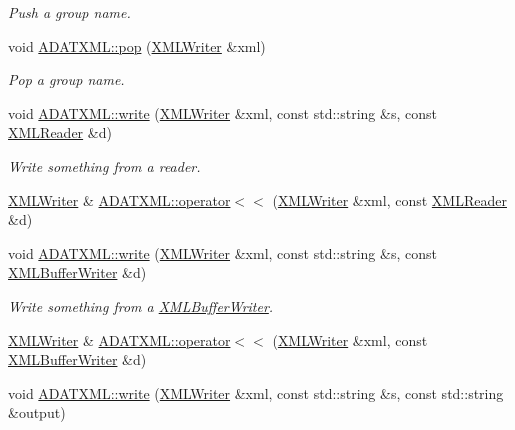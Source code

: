 \begin{DoxyCompactItemize}
\begin{DoxyCompactList}\small\item\em Push a group name. \end{DoxyCompactList}\item 
void \mbox{\hyperlink{group__io_gac235f191b977af85918b9a9d063ba5f4}{A\+D\+A\+T\+X\+M\+L\+::pop}} (\mbox{\hyperlink{classADATXML_1_1XMLWriter}{X\+M\+L\+Writer}} \&xml)
\begin{DoxyCompactList}\small\item\em Pop a group name. \end{DoxyCompactList}\item 
void \mbox{\hyperlink{group__io_ga0b5b9fff1a99b7e41bb286c7c153ff78}{A\+D\+A\+T\+X\+M\+L\+::write}} (\mbox{\hyperlink{classADATXML_1_1XMLWriter}{X\+M\+L\+Writer}} \&xml, const std\+::string \&s, const \mbox{\hyperlink{classADATXML_1_1XMLReader}{X\+M\+L\+Reader}} \&d)
\begin{DoxyCompactList}\small\item\em Write something from a reader. \end{DoxyCompactList}\item 
\mbox{\hyperlink{classADATXML_1_1XMLWriter}{X\+M\+L\+Writer}} \& \mbox{\hyperlink{group__io_gaeedb0da293eebaa00dff464efbb18eab}{A\+D\+A\+T\+X\+M\+L\+::operator$<$$<$}} (\mbox{\hyperlink{classADATXML_1_1XMLWriter}{X\+M\+L\+Writer}} \&xml, const \mbox{\hyperlink{classADATXML_1_1XMLReader}{X\+M\+L\+Reader}} \&d)
\item 
void \mbox{\hyperlink{group__io_ga14c568a7a3ffb3e486c9036ff7382f8e}{A\+D\+A\+T\+X\+M\+L\+::write}} (\mbox{\hyperlink{classADATXML_1_1XMLWriter}{X\+M\+L\+Writer}} \&xml, const std\+::string \&s, const \mbox{\hyperlink{classADATXML_1_1XMLBufferWriter}{X\+M\+L\+Buffer\+Writer}} \&d)
\begin{DoxyCompactList}\small\item\em Write something from a \mbox{\hyperlink{classADATXML_1_1XMLBufferWriter}{X\+M\+L\+Buffer\+Writer}}. \end{DoxyCompactList}\item 
\mbox{\hyperlink{classADATXML_1_1XMLWriter}{X\+M\+L\+Writer}} \& \mbox{\hyperlink{group__io_ga5f6c03929b05296b731cf36fb65cf9c6}{A\+D\+A\+T\+X\+M\+L\+::operator$<$$<$}} (\mbox{\hyperlink{classADATXML_1_1XMLWriter}{X\+M\+L\+Writer}} \&xml, const \mbox{\hyperlink{classADATXML_1_1XMLBufferWriter}{X\+M\+L\+Buffer\+Writer}} \&d)
\item 
void \mbox{\hyperlink{group__io_ga20a076b653822e9476b7712de61b383c}{A\+D\+A\+T\+X\+M\+L\+::write}} (\mbox{\hyperlink{classADATXML_1_1XMLWriter}{X\+M\+L\+Writer}} \&xml, const std\+::string \&s, const std\+::string \&output)

\end{DoxyCompactItemize}
